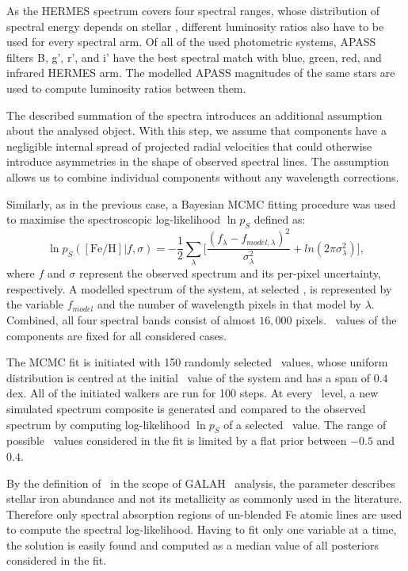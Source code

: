 As the HERMES spectrum covers four spectral ranges, whose distribution of spectral energy depends on stellar \Teff, different luminosity ratios also have to be used for every spectral arm. Of all of the used photometric systems, APASS filters B, g', r', and i' have the best spectral match with blue, green, red, and infrared HERMES arm. The modelled APASS magnitudes of the same stars are used to compute luminosity ratios between them.

The described summation of the spectra introduces an additional assumption about the analysed object. With this step, we assume that components have a negligible internal spread of projected radial velocities that could otherwise introduce asymmetries in the shape of observed spectral lines. The assumption allows us to combine individual components without any wavelength corrections.

Similarly, as in the previous case, a Bayesian MCMC fitting procedure was used to maximise the spectroscopic \hbox{log-likelihood} $\ln p_{S}$ defined as:
\begin{equation}
	\label{equ:lnp_s}
	\ln p_{S}(\mathrm{[Fe/H]} | f, \sigma) = -\frac{1}{2} \sum_{\lambda}^{} \Big[ \frac{(f_{\lambda} - f_{model, \lambda})^2}{\sigma_{\lambda}^2} +ln(2\pi\sigma_{\lambda}^2) \Big],
\end{equation}
where $f$ and $\sigma$ represent the observed spectrum and its per-pixel uncertainty, respectively. A modelled spectrum of the system, at selected \Feh, is represented by the variable $f_{model}$ and the number of wavelength pixels in that model by $\lambda$. Combined, all four spectral bands consist of almost $16,000$ pixels. \Teff\ values of the components are fixed for all considered cases.

The MCMC fit is initiated with 150 randomly selected \Feh\ values, whose uniform distribution is centred at the initial \Feh\ value of the system and has a span of $0.4$ dex. All of the initiated walkers are run for 100 steps. At every \Feh\ level, a new simulated spectrum composite is generated and compared to the observed spectrum by computing log-likelihood $\ln p_{S}$ of a selected \Feh\ value. The range of possible \Feh\ values considered in the fit is limited by a flat prior between $-0.5$ and $0.4$. 

By the definition of \Feh\ in the scope of GALAH \TC\ analysis, the parameter describes stellar iron abundance and not its metallicity as commonly used in the literature. Therefore only spectral absorption regions of un-blended Fe atomic lines are used to compute the spectral log-likelihood. Having to fit only one variable at a time, the solution is easily found and computed as a median value of all posteriors considered in the fit.

